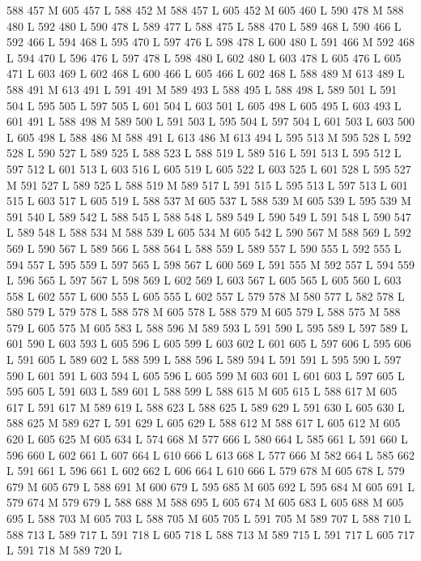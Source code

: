 {{{{{{{{{{{{{{{{{{588 457 M 605 457 L
588 452 M 588 457 L
605 452 M 605 460 L
590 478 M 588 480 L
592 480 L
590 478 L
589 477 L
588 475 L
588 470 L
589 468 L
590 466 L
592 466 L
594 468 L
595 470 L
597 476 L
598 478 L
600 480 L
591 466 M 592 468 L
594 470 L
596 476 L
597 478 L
598 480 L
602 480 L
603 478 L
605 476 L
605 471 L
603 469 L
602 468 L
600 466 L
605 466 L
602 468 L
588 489 M 613 489 L
588 491 M 613 491 L
591 491 M 589 493 L
588 495 L
588 498 L
589 501 L
591 504 L
595 505 L
597 505 L
601 504 L
603 501 L
605 498 L
605 495 L
603 493 L
601 491 L
588 498 M 589 500 L
591 503 L
595 504 L
597 504 L
601 503 L
603 500 L
605 498 L
588 486 M 588 491 L
613 486 M 613 494 L
595 513 M 595 528 L
592 528 L
590 527 L
589 525 L
588 523 L
588 519 L
589 516 L
591 513 L
595 512 L
597 512 L
601 513 L
603 516 L
605 519 L
605 522 L
603 525 L
601 528 L
595 527 M 591 527 L
589 525 L
588 519 M 589 517 L
591 515 L
595 513 L
597 513 L
601 515 L
603 517 L
605 519 L
588 537 M 605 537 L
588 539 M 605 539 L
595 539 M 591 540 L
589 542 L
588 545 L
588 548 L
589 549 L
590 549 L
591 548 L
590 547 L
589 548 L
588 534 M 588 539 L
605 534 M 605 542 L
590 567 M 588 569 L
592 569 L
590 567 L
589 566 L
588 564 L
588 559 L
589 557 L
590 555 L
592 555 L
594 557 L
595 559 L
597 565 L
598 567 L
600 569 L
591 555 M 592 557 L
594 559 L
596 565 L
597 567 L
598 569 L
602 569 L
603 567 L
605 565 L
605 560 L
603 558 L
602 557 L
600 555 L
605 555 L
602 557 L
579 578 M 580 577 L
582 578 L
580 579 L
579 578 L
588 578 M 605 578 L
588 579 M 605 579 L
588 575 M 588 579 L
605 575 M 605 583 L
588 596 M 589 593 L
591 590 L
595 589 L
597 589 L
601 590 L
603 593 L
605 596 L
605 599 L
603 602 L
601 605 L
597 606 L
595 606 L
591 605 L
589 602 L
588 599 L
588 596 L
589 594 L
591 591 L
595 590 L
597 590 L
601 591 L
603 594 L
605 596 L
605 599 M 603 601 L
601 603 L
597 605 L
595 605 L
591 603 L
589 601 L
588 599 L
588 615 M 605 615 L
588 617 M 605 617 L
591 617 M 589 619 L
588 623 L
588 625 L
589 629 L
591 630 L
605 630 L
588 625 M 589 627 L
591 629 L
605 629 L
588 612 M 588 617 L
605 612 M 605 620 L
605 625 M 605 634 L
574 668 M 577 666 L
580 664 L
585 661 L
591 660 L
596 660 L
602 661 L
607 664 L
610 666 L
613 668 L
577 666 M 582 664 L
585 662 L
591 661 L
596 661 L
602 662 L
606 664 L
610 666 L
579 678 M 605 678 L
579 679 M 605 679 L
588 691 M 600 679 L
595 685 M 605 692 L
595 684 M 605 691 L
579 674 M 579 679 L
588 688 M 588 695 L
605 674 M 605 683 L
605 688 M 605 695 L
588 703 M 605 703 L
588 705 M 605 705 L
591 705 M 589 707 L
588 710 L
588 713 L
589 717 L
591 718 L
605 718 L
588 713 M 589 715 L
591 717 L
605 717 L
591 718 M 589 720 L
}}}}}}}}}}}}}}}}}}
